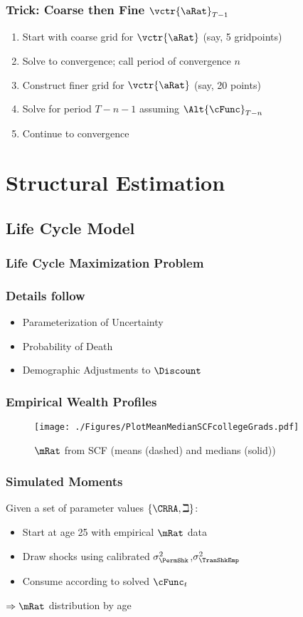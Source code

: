 \documentclass{beamer}
\begin{document}
\begin{frame}
\frametitle{Trick: Coarse then Fine $\vctr{\aRat}_{T-1}$}

\begin{enumerate}
\item Start with coarse grid for $\vctr{\aRat}$ (say, 5 gridpoints)
\item Solve to convergence; call period of convergence $n$
\item Construct finer grid for $\vctr{\aRat}$ (say, 20 points)
\item Solve for period $T-n-1$ assuming $\Alt{\cFunc}_{T-n}$ 
\item Continue to convergence
\end{enumerate}

\end{frame}

\section{Structural Estimation}
\subsection{Life Cycle Model}

\begin{frame}
\frametitle{Life Cycle Maximization Problem}


\end{frame}

\begin{frame}
\frametitle{Details follow~\cite{cagettiWprofiles}}
\begin{itemize}
\item Parameterization of Uncertainty
\item Probability of Death
\item Demographic Adjustments to $\Discount$
\end{itemize}
\end{frame}

\begin{frame}
\frametitle{Empirical Wealth Profiles}
\begin{figure}
    \texttt{[image: ./Figures/PlotMeanMedianSCFcollegeGrads.pdf]}
    \caption{$\mRat$ from SCF (means (dashed) and medians (solid))}
    \label{fig:MeanMedianSCF}
\end{figure}
\end{frame}

\begin{frame}
\frametitle{Simulated Moments}

Given a set of parameter values $\{\CRRA,\beth\}$:
\begin{itemize}
\item Start at age 25 with empirical $\mRat$ data
\item Draw shocks using calibrated $\sigma^{2}_{\PermShk}$,$\sigma^{2}_{\TranShkEmp}$
\item Consume according to solved $\cFunc_{t}$
\end{itemize}
\pause 
$\Rightarrow \mRat$ distribution by age
\end{frame}
\end{document}
